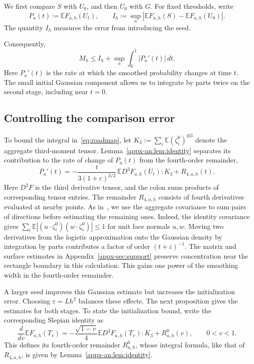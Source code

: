 \documentclass[11pt,letterpaper]{article}
\theoremstyle{remark}
\newcommand{\E}{\mathbb E}
\begin{document}
We first compare \(S\) with \(U_0\), and then \(U_0\) with \(G\).
For fixed thresholds, write
\[
 P_a(t)\coloneqq\E F_{a,h}(U_t),\qquad
 I_h\coloneqq\sup_a|\E F_{a,h}(S)-\E F_{a,h}(U_0)|.
\]
The quantity \(I_h\) measures the error from introducing the seed.

Consequently,
\begin{equation}
 M_h\le I_h+\sup_a\int_0^1|P_a'(t)|\,dt .
 \label{eq:roadmap}
\end{equation}
Here \(P_a'(t)\) is the rate at which the smoothed probability changes
at time \(t\). The small initial Gaussian component allows us to
integrate by parts twice on the second stage, including near \(t=0\).

\subsection{Controlling the comparison error}
\label{sec:outline-seeded}

To bound the integral in~\eqref{eq:roadmap}, let
\(K_3:=\sum_i\E(\zeta_i^0)^{\otimes3}\) denote the aggregate
third-moment tensor. Lemma~\ref{appx-an:lem:identity} separates its contribution
to the rate of change of \(P_a(t)\) from the fourth-order remainder,
\begin{equation}
 P_a'(t)=
 -\frac{t}{3(1+\varepsilon)^{3/2}}\,
       \E D^3F_{a,h}(U_t):K_3+R_{4,a,h}(t).
 \label{eq:path-summary}
\end{equation}
Here \(D^3F\) is the third derivative tensor, and the colon sums
products of corresponding tensor entries. The remainder \(R_{4,a,h}\) consists of fourth derivatives evaluated
at nearby points. As in~\cite[Lemmas~22--23]{GaoZhang}, we use the aggregate
covariance to sum pairs of directions before estimating the remaining
ones. Indeed, the identity covariance gives
\(\sum_i\E|(u\cdot\zeta_i^0)(w\cdot\zeta_i^0)|\le1\) for unit face
normals \(u,w\). Moving two derivatives from the logistic approximation
onto the Gaussian density by integration by parts contributes a
factor of order \((t+\varepsilon)^{-1}\). The matrix and surface estimates
in Appendix~\ref{appx-sec:support} preserve concentration near the
rectangle boundary in this calculation. This gains one power of the
smoothing width in the fourth-order remainder.

A larger seed improves this Gaussian estimate but increases the
initialization error. Choosing \(\varepsilon=Lh^2\) balances these
effects. The next proposition gives the estimates for both stages.
To state the initialization bound, write the corresponding Slepian
identity as
\[
 \frac{d}{dv}\E F_{a,h}(T_v)
 =-\frac{\sqrt{1-v}}4\E D^3F_{a,h}(T_v):K_3+R^0_{a,h}(v),
 \qquad 0<v<1.
\]
This defines its fourth-order remainder \(R^0_{a,h}\), whose integral
formula, like that of \(R_{4,a,h}\), is given by
Lemma~\ref{appx-an:lem:identity}.
\end{document}
